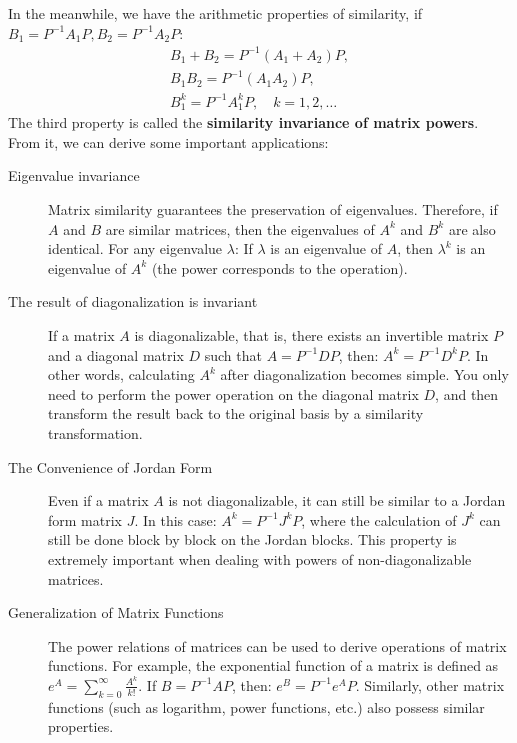 \documentclass[11pt]{../../TexTemplate/elegantbook} %
\begin{document}
In the meanwhile, we have the arithmetic properties of similarity, if \(B_{1} = P^{-1} A_{1} P, B_{2} = P^{-1} A_{2} P\):
\begin{gather*}
    B_{1} + B_{2} = P^{-1}(A_{1} + A_{2})P, \\
    B_{1} B_{2} = P^{-1}(A_{1} A_{2})P, \\
    B_{1}^{k} = P^{-1} A_{1}^{k} P, \quad k = 1, 2, \dots
\end{gather*}
The third property is called the \textbf{similarity invariance of matrix powers}.
From it, we can derive some important applications:
\begin{description}
    \item[Eigenvalue invariance] Matrix similarity guarantees the preservation of eigenvalues. 
        Therefore, if \(A\) and \(B\) are similar matrices, then the eigenvalues of \(A^k\) and \(B^k\) are also identical. 
        For any eigenvalue \( \lambda \): If \( \lambda \) is an eigenvalue of \( A \), 
        then \( \lambda^k \) is an eigenvalue of \( A^k \) (the power corresponds to the operation).
    \item[The result of diagonalization is invariant] If a matrix \( A \) is diagonalizable, that is, 
        there exists an invertible matrix \( P \) and a diagonal matrix \( D \) 
        such that \( A = P^{-1} D P \), then: \( A^k = P^{-1} D^k P \). 
        In other words, calculating \( A^k \) after diagonalization becomes simple. 
        You only need to perform the power operation on the diagonal matrix \( D \), 
        and then transform the result back to the original basis by a similarity transformation.
    \item[The Convenience of Jordan Form] Even if a matrix \( A \) is not diagonalizable, 
        it can still be similar to a Jordan form matrix \( J \). 
        In this case: \( A^k = P^{-1} J^k P \), 
        where the calculation of \( J^k \) can still be done block by block on the Jordan blocks. 
        This property is extremely important when dealing with powers of non-diagonalizable matrices.
    \item[Generalization of Matrix Functions] The power relations of matrices can be used to derive operations of matrix functions. 
        For example, the exponential function of a matrix is defined as \(e^{A} = \sum_{k=0}^{\infty} \frac{A^{k}}{k!} \). 
        If \( B = P^{-1}AP \), then: \( e^{B} = P^{-1}e^{A}P \). 
        Similarly, other matrix functions (such as logarithm, power functions, etc.) also possess similar properties.
\end{description}
\end{document}
